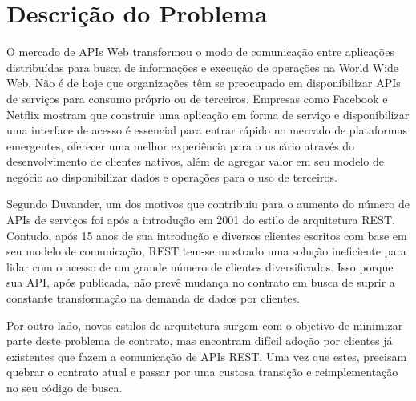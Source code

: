 \section[Descrição do Problema]{Descrição do Problema}

O mercado de APIs Web transformou o modo de comunicação entre aplicações distribuídas para busca de informações e execução de operações na World Wide Web. Não é de hoje que organizações têm se preocupado em disponibilizar APIs de serviços para consumo próprio ou de terceiros. Empresas como Facebook e Netflix mostram que construir uma aplicação em forma de serviço e disponibilizar uma interface de acesso é essencial para entrar rápido no mercado de plataformas emergentes, oferecer uma melhor experiência para o usuário através do desenvolvimento de clientes nativos, além de agregar valor em seu modelo de negócio ao disponibilizar dados e operações para o uso de terceiros. \cite{Art2016}

Segundo Duvander, um dos motivos que contribuiu para o aumento do número de APIs de serviços foi após a introdução em 2001 do estilo de arquitetura REST. Contudo, após 15 anos de sua introdução e diversos clientes escritos com base em seu modelo de comunicação, REST tem-se mostrado uma solução ineficiente para lidar com o acesso de um grande número de clientes diversificados. Isso porque sua API, após publicada, não prevê mudança no contrato em busca de suprir a constante transformação na demanda de dados por clientes. \cite{Duvander2013-2}

Por outro lado, novos estilos de arquitetura surgem com o objetivo de minimizar parte deste problema de contrato, mas encontram difícil adoção por clientes já existentes que fazem a comunicação de APIs REST. Uma vez que estes, precisam quebrar o contrato atual e passar por uma custosa transição e reimplementação no seu código de busca.
